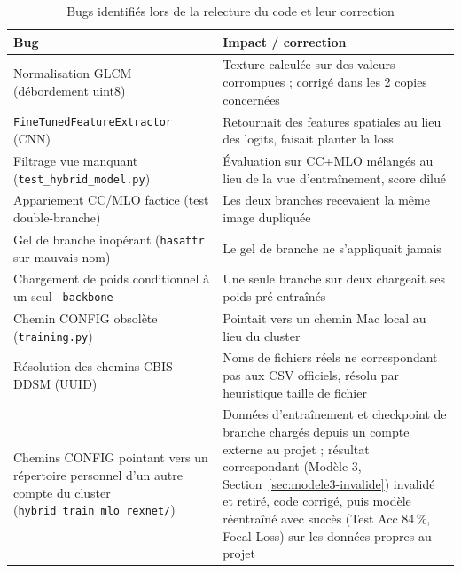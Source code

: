 \documentclass[12pt,a4paper]{report}
\begin{document}
\begin{table}[h]
\centering
\small
\caption{Bugs identifiés lors de la relecture du code et leur correction}
\begin{tabular}{p{5cm}p{9cm}}
\toprule
Bug & Impact / correction \\
\midrule
Normalisation GLCM (débordement uint8) & Texture calculée sur des valeurs corrompues ; corrigé dans les 2 copies concernées \\
\texttt{FineTunedFeatureExtractor} (CNN) & Retournait des features spatiales au lieu des logits, faisait planter la loss \\
Filtrage vue manquant (\texttt{test\_hybrid\_model.py}) & Évaluation sur CC+MLO mélangés au lieu de la vue d'entraînement, score dilué \\
Appariement CC/MLO factice (test double-branche) & Les deux branches recevaient la même image dupliquée \\
Gel de branche inopérant (\texttt{hasattr} sur mauvais nom) & Le gel de branche ne s'appliquait jamais \\
Chargement de poids conditionnel à un seul \texttt{--backbone} & Une seule branche sur deux chargeait ses poids pré-entraînés \\
Chemin CONFIG obsolète (\texttt{training.py}) & Pointait vers un chemin Mac local au lieu du cluster \\
Résolution des chemins CBIS-DDSM (UUID) & Noms de fichiers réels ne correspondant pas aux CSV officiels, résolu par heuristique taille de fichier \\
Chemins CONFIG pointant vers un répertoire personnel d'un autre compte du cluster (\texttt{hybrid~train~mlo~rexnet/}) & Données d'entraînement et checkpoint de branche chargés depuis un compte externe au projet ; résultat correspondant (Modèle 3, Section~\ref{sec:modele3-invalide}) invalidé et retiré, code corrigé, puis modèle réentraîné avec succès (Test Acc 84\,\%, Focal Loss) sur les données propres au projet \\
\bottomrule
\end{tabular}
\end{table}

\end{document}

